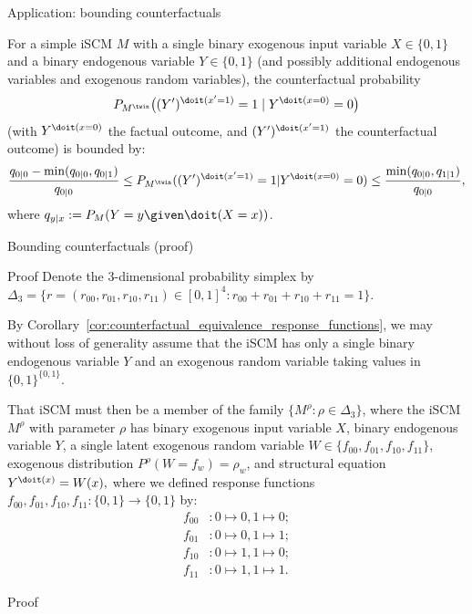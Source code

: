\begin{frame}{Application: bounding counterfactuals}
\begin{Prp}
  For a simple iSCM $M$ with a single binary exogenous input variable $X \in \{0,1\}$ and a binary endogenous variable $Y \in \{0,1\}$
  (and possibly additional endogenous variables and exogenous random variables), the counterfactual probability
  $$P_{M^{\twin}}\big((Y')^{\doit(x'=1)}=1\mid Y^{\doit(x=0)}=0\big)$$
  (with $Y^{\doit(x=0)}$ the factual outcome, and $(Y')^{\doit(x'=1)}$ the counterfactual outcome)
  is bounded by:
  {\small\begin{equation*}
    \frac{q_{0|0} - \min(q_{0|0},q_{0|1})}{q_{0|0}} 
    \le P_{M^\twin}((Y')^{\doit(x'=1)} = 1 | Y^{\doit(x=0)}=0)
    \le \frac{\min(q_{0|0},q_{1|1})}{q_{0|0}},
  \end{equation*}}
  where $q_{y|x} := P_M(Y=y\given \doit(X=x))$.
\end{Prp}
\end{frame}

\begin{frame}{Bounding counterfactuals (proof)}
  \begin{block}{Proof}
    Denote the $3$-dimensional probability simplex by $\Delta_3=\{r=(r_{00},r_{01},r_{10},r_{11}) \in [0,1]^4 : r_{00}+r_{01}+r_{10}+r_{11}= 1\}$.
  
    By Corollary~\ref{cor:counterfactual_equivalence_response_functions}, we may without loss of generality assume that the iSCM has only a single binary endogenous variable $Y$ and an exogenous random variable taking values in $\{0,1\}^{\{0,1\}}$.

    That iSCM must then be a member of the family $\{M^\rho : \rho \in \Delta_3\}$, where the iSCM $M^\rho$ with parameter $\rho$ has binary exogenous input variable $X$, binary endogenous variable $Y$, a single latent exogenous random variable $W \in \{f_{00},f_{01},f_{10},f_{11}\}$, exogenous distribution $P^\rho(W=f_w) = \rho_w$, and structural equation
  $Y^{\doit(x)} = W(x),$
where we defined response functions $f_{00},f_{01},f_{10},f_{11} : \{0,1\} \to \{0,1\}$ by:
    {\small\begin{align*}
    f_{00} &: 0 \mapsto 0, 1 \mapsto 0;\\
    f_{01} &: 0 \mapsto 0, 1 \mapsto 1;\\
    f_{10} &: 0 \mapsto 1, 1 \mapsto 0;\\
    f_{11} &: 0 \mapsto 1, 1 \mapsto 1.
    \end{align*}}
  \end{block}{Proof}
\end{frame}


